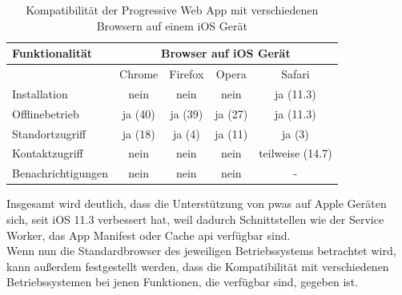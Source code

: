 \begin{table}[ht]
\centering
\caption{Kompatibilität der Progressive Web App mit verschiedenen Browsern auf einem iOS Gerät}
\begin{tabular}{|l|c|c|c|c|}
\hline
\textbf{Funktionalität} & \multicolumn{4}{c|}{\textbf{Browser auf iOS Gerät}} \\ \hline
                   & Chrome  & Firefox & Opera   & Safari           \\ \hline
Installation       & nein    & nein    & nein    & ja (11.3)        \\ \hline
Offlinebetrieb     & ja (40) & ja (39) & ja (27) & ja (11.3)        \\ \hline
Standortzugriff    & ja (18) & ja (4)  & ja (11) & ja (3)           \\ \hline
Kontaktzugriff     & nein    & nein    & nein    & teilweise (14.7) \\ \hline
Benachrichtigungen & nein    & nein    & nein    & -               \\ \hline
\end{tabular}
\label{fig:compability_ios}
\end{table}

Insgesamt wird deutlich, dass die Unterstützung von \acp{pwa} auf Apple Geräten sich, seit iOS 11.3 verbessert hat, weil dadurch Schnittstellen wie der Service Worker, das App Manifest oder Cache \ac{api} verfügbar sind.\\
Wenn nun die Standardbrowser des jeweiligen Betriebssystems betrachtet wird, kann außerdem festgestellt werden, dass die Kompatibilität mit verschiedenen Betriebssystemen bei jenen Funktionen, die verfügbar sind, gegeben ist.


